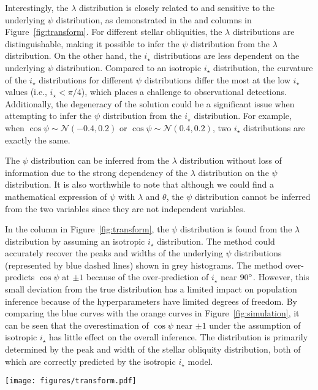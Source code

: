 \documentclass[twocolumn,times]{aastex631}
\begin{document}
Interestingly, the $\lambda$ distribution is closely related to and sensitive to the underlying $\psi$ distribution, as demonstrated in the  and  columns in Figure~\ref{fig:transform}. For different stellar obliquities, the $\lambda$ distributions are distinguishable, making it possible to infer the $\psi$ distribution from the $\lambda$ distribution. On the other hand, the $i_\star$ distributions are less dependent on the underlying $\psi$ distribution. Compared to an isotropic $i_\star$ distribution, the curvature of the $i_\star$ distributions for different $\psi$ distributions differ the most at the low $i_\star$ values (i.e., $i_\star < \pi/4$), which places a challenge to observational detections. 
Additionally, the degeneracy of the solution could be a significant issue when attempting to infer the $\psi$ distribution from the $i_\star$ distribution. For example, when $\cos{\psi} \sim \mathcal{N}(-0.4,0.2)$ or $\cos{\psi} \sim \mathcal{N}(0.4,0.2)$, two $i_\star$ distributions are exactly the same.

The $\psi$ distribution can be inferred from the $\lambda$ distribution without loss of information due to the strong dependency of the $\lambda$ distribution on the $\psi$ distribution. It is also worthwhile to note that although we could find a mathematical expression of $\psi$ with $\lambda$ and $\theta$, the $\psi$ distribution cannot be inferred from the two variables since they are not independent variables.

In the  column in Figure~\ref{fig:transform}, the $\psi$ distribution is found from the $\lambda$ distribution by assuming an isotropic $i_\star$ distribution. The method could accurately recover the peaks and widths of the underlying $\psi$ distributions (represented by blue dashed lines) shown in grey histograms. The method over-predicts $\cos{\psi}$ at $\pm 1$ because of the over-prediction of $i_\star$ near $90\mbox{$^\circ$}$. However, this small deviation from the true distribution has a limited impact on population inference because of the hyperparameters have limited degrees of freedom. By comparing the blue curves with the orange curves in Figure~\ref{fig:simulation}, it can be seen that the overestimation of $\cos{\psi}$ near $\pm1$ under the assumption of isotropic $i_\star$ has little effect on the overall inference. The distribution is primarily determined by the peak and width of the stellar obliquity distribution, both of which are correctly predicted by the isotropic $i_\star$ model.

\begin{figure*}[ht!]
    \texttt{[image: figures/transform.pdf]}
    \caption{Simulated $\cos{\psi}$ distributions ( column) and the corresponding distributions of sky-projected stellar obliquity $\lambda$ ( column) and stellar inclination $i_\star$ ( column). The inferred $\cos{\psi}$ distributions assuming isotropic stellar inclinations are shown in the  column. The grey histograms present the random samplings of $\lambda$ and $i_\star$ from the $\cos{\psi}$ distributions, and the blue curves present the numerical solutions.}
    \label{fig:transform}
\end{figure*}
\end{document}
